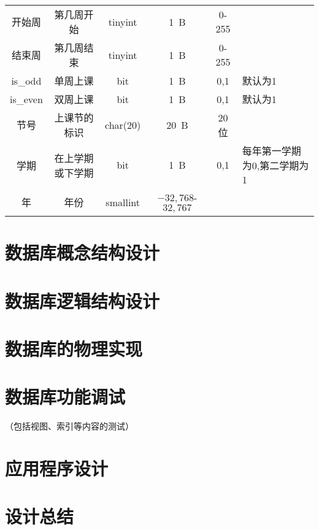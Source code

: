 \documentclass{myreport}
\begin{document}
\begin{longtable}{cccccl}
        开始周   & 第几周开始 & tinyint & \SI{1}{B} & 0-255 & \\
        结束周   & 第几周结束 & tinyint & \SI{1}{B} & 0-255 & \\
        is\_odd  & 单周上课 & bit & \SI{1}{B} & 0,1 & 默认为1 \\
        is\_even & 双周上课 & bit & \SI{1}{B} & 0,1 & 默认为1 \\
        节号      & 上课节的标识 & char(20) & \SI{20}{B} & 20位 & \\
        学期      & 在上学期或下学期 & bit & \SI{1}{B} & 0,1 & 每年第一学期为0,第二学期为1 \\
        年        & 年份 & smallint & $-32,768$- $32,767$ & &\\

    \end{longtable}




\section{数据库概念结构设计}

\section{数据库逻辑结构设计}

\section{数据库的物理实现}

\section{数据库功能调试}
（包括视图、索引等内容的测试）

\section{应用程序设计}

\section{设计总结}





\nocite{silberschatz1997database} %
\nocite{sqldbm} %
\nocite{pyqt5} %
\end{document}
